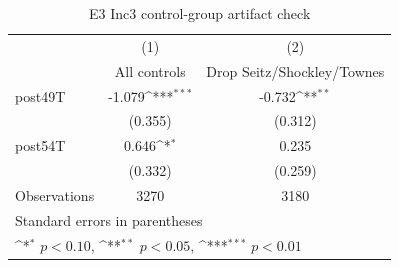 \begin{table}[htbp]\centering
\def\sym#1{\ifmmode^{#1}\else\(^{#1}\)\fi}
\caption{E3 Inc3 control-group artifact check}
\begin{tabular}{l*{2}{c}}
\toprule
                    &\multicolumn{1}{c}{(1)}&\multicolumn{1}{c}{(2)}\\
                    &\multicolumn{1}{c}{All controls}&\multicolumn{1}{c}{Drop Seitz/Shockley/Townes}\\
\midrule
post49T             &      -1.079\sym{***}&      -0.732\sym{**} \\
                    &     (0.355)         &     (0.312)         \\
\addlinespace
post54T             &       0.646\sym{*}  &       0.235         \\
                    &     (0.332)         &     (0.259)         \\
\midrule
Observations        &        3270         &        3180         \\
\bottomrule
\multicolumn{3}{l}{\footnotesize Standard errors in parentheses}\\
\multicolumn{3}{l}{\footnotesize \sym{*} \(p<0.10\), \sym{**} \(p<0.05\), \sym{***} \(p<0.01\)}\\
\end{tabular}
\end{table}
